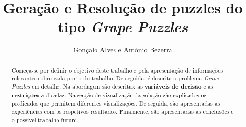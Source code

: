 \documentclass[runningheads]{llncs}
\begin{document}
%
\title{Geração e Resolução de puzzles do tipo \textit{Grape Puzzles}}
%
%
\author{Gonçalo Alves e
António Bezerra}
%
%
%
\maketitle              %
%
\begin{abstract}
Começa-se por definir o objetivo deste trabalho e pela apresentação de informações relevantes sobre cada ponto do trabalho.
De seguida, é descrito o problema \textit{Grape Puzzles} em detalhe.
Na abordagem são descritas: as \textbf{variáveis de decisão} e as \textbf{restrições} aplicadas.
Na secção de visualização da solução são explicados os predicados que permitem diferentes visualizações.
De seguida, são apresentadas as experiências com os respetivos resultados.
Finalmente, são apresentadas as conclusões e o possível trabalho futuro.

\end{abstract}
%
%
%








\end{document}
